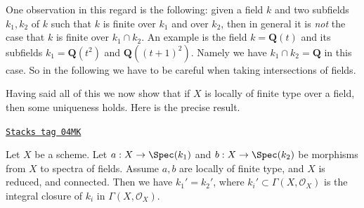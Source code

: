 \medskip\noindent
One observation in this regard is the following: given a field
$k$ and two subfields $k_1, k_2$ of $k$ such that $k$ is finite
over $k_1$ and over $k_2$, then in general it is {\it not} the case
that $k$ is finite over $k_1 \cap k_2$. An example is the field
$k = \mathbf{Q}(t)$ and its subfields $k_1 = \mathbf{Q}(t^2)$ and
$\mathbf{Q}((t + 1)^2)$. Namely we have $k_1 \cap k_2 = \mathbf{Q}$
in this case. So in the following we have to be careful when taking
intersections of fields.

\medskip\noindent
Having said all of this we now show that if $X$ is locally of finite
type over a field, then some uniqueness holds. Here is the precise
result.

\begin{proposition}
\label{varieties-proposition-unique-base-field}
\href{https://stacks.math.columbia.edu/tag/04MK}{\texttt{Stacks tag 04MK}}

Let $X$ be a scheme. Let $a : X \to \Spec(k_1)$ and
$b : X \to \Spec(k_2)$ be morphisms from $X$ to spectra of fields.
Assume $a, b$ are locally of finite type, and
$X$ is reduced, and connected. Then we have
$k_1' = k_2'$, where $k_i' \subset \Gamma(X, \mathcal{O}_X)$ is
the integral closure of $k_i$ in $\Gamma(X, \mathcal{O}_X)$.
\end{proposition}

